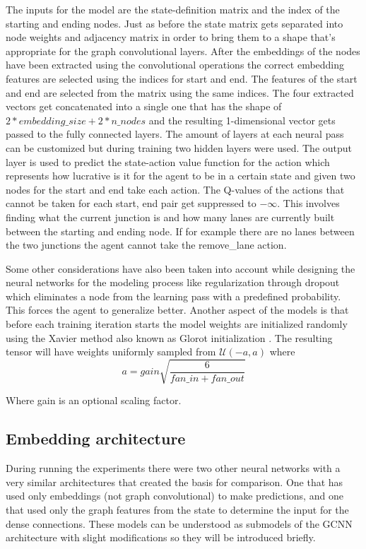 \documentclass[
]{elteikthesis}[2023/04/10]
\begin{document}
The inputs for the model are the state-definition matrix and the index
of the starting and ending nodes. Just as before the state matrix
gets separated into node weights and adjacency matrix in order to
bring them to a shape that's appropriate for the graph convolutional
layers. After the embeddings of the nodes have been extracted using
the convolutional operations the correct embedding features are selected
using the indices for start and end. The features of the start and
end are selected from the matrix using the same indices. The four
extracted vectors get concatenated into a single one that has the
shape of $2*embedding\_size+2*n\_nodes$ and the resulting 1-dimensional
vector gets passed to the fully connected layers. The amount of layers
at each neural pass can be customized but during training two hidden
layers were used. The output layer is used to predict the state-action
value function for the action which represents how lucrative is it
for the agent to be in a certain state and given two nodes for the
start and end take each action. The Q-values of the actions that cannot
be taken for each start, end pair get suppressed to $-\infty$. This
involves finding what the current junction is and how many lanes are
currently built between the starting and ending node. If for example
there are no lanes between the two junctions the agent cannot take
the remove\_lane action.

Some other considerations have also been taken into account while
designing the neural networks for the modeling process like regularization
through dropout which eliminates a node from the learning pass with
a predefined probability. This forces the agent to generalize better.
Another aspect of the models is that before each training iteration
starts the model weights are initialized randomly using the Xavier
method also known as Glorot initialization \cite{glorot2010understanding}.
The resulting tensor will have weights uniformly sampled from $\mathcal{U}(-a,a)$
where 
\begin{equation}
a=gain\sqrt{\frac{6}{fan\_in+fan\_out}}
\end{equation}

Where gain is an optional scaling factor.

\subsection{Embedding architecture}

During running the experiments there were two other neural networks
with a very similar architectures that created the basis for comparison.
One that has used only embeddings (not graph convolutional) to make
predictions, and one that used only the graph features from the state
to determine the input for the dense connections. These models can
be understood as submodels of the GCNN architecture with slight modifications
so they will be introduced briefly.
\end{document}
